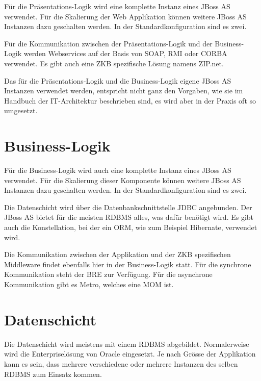   Für die Präsentations-Logik wird eine komplette Instanz eines JBoss AS
  verwendet. Für die Skalierung der Web Applikation können weitere
  JBoss AS Instanzen dazu geschalten werden. In der Standardkonfiguration sind
  es zwei.
  
  Für die Kommunikation zwischen der Präsentations-Logik und der Business-Logik
  werden Webservices auf der Basis von \ac{SOAP}, \ac{RMI} oder \ac{CORBA}
  verwendet. Es gibt auch eine \ac{ZKB} spezifische Lösung namens ZIP.net.
  
  Das für die Präsentations-Logik und die Business-Logik eigene JBoss AS
  Instanzen verwendet werden, entspricht nicht ganz den Vorgaben, wie sie
  im Handbuch der IT-Architektur beschrieben sind, es wird aber in der Praxis
  oft so umgesetzt.
    
  \section{Business-Logik}
  
  Für die Business-Logik wird auch eine komplette Instanz eines JBoss AS
  verwendet. Für die Skalierung dieser Komponente können weitere JBoss AS
  Instanzen dazu geschalten werden. In der Standardkonfiguration sind es zwei.
  
  Die Datenschicht wird über die Datenbankschnittstelle \ac{JDBC} angebunden.
  Der JBoss AS bietet für die meisten \ac{RDBMS} alles, was dafür benötigt
  wird. Es gibt auch die Konstellation, bei der ein \ac{ORM}, wie zum Beispiel
  Hibernate, verwendet wird.
  
  Die Kommunikation zwischen der Applikation und der ZKB spezifischen Middleware
  findet ebenfalls hier in der Business-Logik statt. Für die synchrone
  Kommunikation steht der \ac{BRE} zur Verfügung. Für die asynchrone
  Kommunikation gibt es Metro, welches eine \ac{MOM} ist.
    
  \section{Datenschicht}
  
  Die Datenschicht wird meistens mit einem \ac{RDBMS} abgebildet. Normalerweise
  wird die Enterpriselösung von Oracle eingesetzt. Je nach Grösse der
  Applikation kann es sein, dass mehrere verschiedene oder mehrere Instanzen des
  selben \ac{RDBMS} zum Einsatz kommen.

